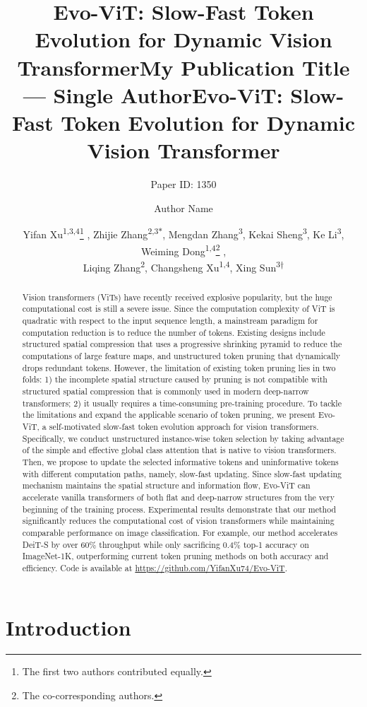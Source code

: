 \documentclass[letterpaper]{article} \usepackage{aaai22}  \usepackage{times}  \usepackage{helvet}  \usepackage{courier}  \usepackage[hyphens]{url}  \usepackage{graphicx} \urlstyle{rm} \def\UrlFont{\rm}  \usepackage{natbib}  \usepackage{caption} \DeclareCaptionStyle{ruled}{labelfont=normalfont,labelsep=colon,strut=off} \frenchspacing  \setlength{\pdfpagewidth}{8.5in}  \setlength{\pdfpageheight}{11in}  \usepackage{algorithm}
\title{Evo-ViT: Slow-Fast Token Evolution for Dynamic Vision Transformer}
\author{Paper ID: 1350}
\title{My Publication Title --- Single Author}
\author {
    Author Name
}
\title{Evo-ViT: Slow-Fast Token Evolution for Dynamic Vision Transformer}
\author{Yifan Xu\textsuperscript{\rm 1,3,4}\thanks{The first two authors contributed equally. 
}
, Zhijie Zhang\textsuperscript{\rm 2,3$*$}, Mengdan Zhang\textsuperscript{\rm 3}, Kekai Sheng\textsuperscript{\rm 3}, Ke Li\textsuperscript{\rm 3}, Weiming Dong\textsuperscript{\rm 1,4}\thanks{The co-corresponding authors.}
, \\Liqing Zhang\textsuperscript{\rm 2}, Changsheng Xu\textsuperscript{\rm 1,4}, Xing Sun\textsuperscript{\rm 3$\dagger$}\\}
\begin{document}
\maketitle


\begin{abstract}




Vision transformers (ViTs) have recently received explosive popularity, but the huge computational cost is still a severe issue. Since the computation complexity of ViT is quadratic with respect to the input sequence length, a mainstream paradigm for computation reduction is to reduce the number of tokens. Existing designs include structured spatial compression that uses a progressive shrinking pyramid to reduce the computations of large feature maps, and unstructured token pruning that dynamically drops redundant tokens. However, the limitation of existing token pruning lies in two folds: 
1) the incomplete spatial structure caused by pruning is not compatible with structured spatial compression that is commonly used in modern deep-narrow transformers;
2) it usually requires a time-consuming pre-training procedure.
To tackle the limitations and expand the applicable scenario of token pruning, we present Evo-ViT, a self-motivated slow-fast token  evolution approach for vision transformers. Specifically, we conduct unstructured instance-wise token selection by taking advantage of the  simple and effective global class attention that is native to vision transformers. Then, we propose to update the selected informative tokens and uninformative tokens with different computation paths, namely, slow-fast updating. Since slow-fast updating mechanism maintains the spatial structure and information flow, Evo-ViT can accelerate vanilla transformers of both flat and deep-narrow structures from the very beginning of the training process. Experimental results demonstrate that our method significantly reduces the computational cost of vision transformers while maintaining comparable performance on image classification. For example, our method accelerates DeiT-S by over 60$\%$ throughput while only sacrificing 0.4$\%$ top-1 accuracy on ImageNet-1K, outperforming current token pruning methods on both accuracy and efficiency.
Code is available at \textcolor{gray}{\url{https://github.com/YifanXu74/Evo-ViT}}.
\end{abstract}
 
\section{Introduction}
\label{sec:introduction}
\end{document}
